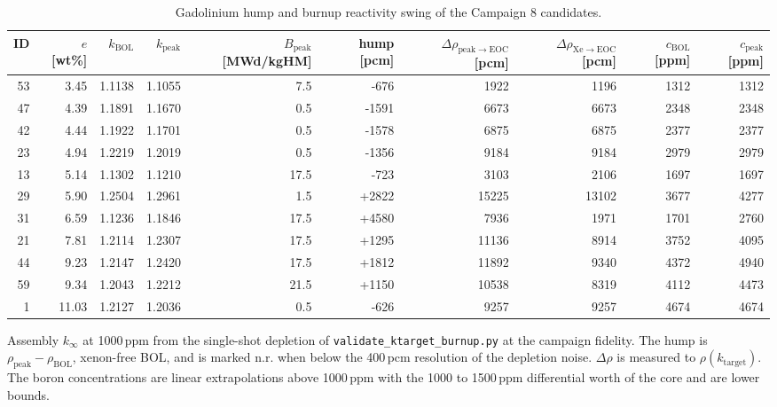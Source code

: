 \begin{table}[htbp]
  \centering
  \caption[Reactivity swing of the Campaign 8 candidates]{Gadolinium hump and burnup reactivity swing of the Campaign 8 candidates.}
  \label{tab:c8-swing}
  \begin{threeparttable}
  \begin{tabular}{@{}r r r r r r r r r r@{}}
    \toprule
    ID & $e$ [wt\%] & $k_\mathrm{BOL}$ & $k_\mathrm{peak}$ & $B_\mathrm{peak}$ [MWd/kgHM] & hump [pcm] & $\Delta\rho_\mathrm{peak\to EOC}$ [pcm] & $\Delta\rho_\mathrm{Xe\to EOC}$ [pcm] & $c_\mathrm{BOL}$ [ppm] & $c_\mathrm{peak}$ [ppm] \\
    \midrule
    53 & 3.45 & 1.1138 & 1.1055 & 7.5 & -676 & 1922 & 1196 & 1312 & 1312 \\
    47 & 4.39 & 1.1891 & 1.1670 & 0.5 & -1591 & 6673 & 6673 & 2348 & 2348 \\
    42 & 4.44 & 1.1922 & 1.1701 & 0.5 & -1578 & 6875 & 6875 & 2377 & 2377 \\
    23 & 4.94 & 1.2219 & 1.2019 & 0.5 & -1356 & 9184 & 9184 & 2979 & 2979 \\
    13 & 5.14 & 1.1302 & 1.1210 & 17.5 & -723 & 3103 & 2106 & 1697 & 1697 \\
    29 & 5.90 & 1.2504 & 1.2961 & 1.5 & +2822 & 15225 & 13102 & 3677 & 4277 \\
    31 & 6.59 & 1.1236 & 1.1846 & 17.5 & +4580 & 7936 & 1971 & 1701 & 2760 \\
    21 & 7.81 & 1.2114 & 1.2307 & 17.5 & +1295 & 11136 & 8914 & 3752 & 4095 \\
    44 & 9.23 & 1.2147 & 1.2420 & 17.5 & +1812 & 11892 & 9340 & 4372 & 4940 \\
    59 & 9.34 & 1.2043 & 1.2212 & 21.5 & +1150 & 10538 & 8319 & 4112 & 4473 \\
    1 & 11.03 & 1.2127 & 1.2036 & 0.5 & -626 & 9257 & 9257 & 4674 & 4674 \\
    \bottomrule
  \end{tabular}
  \begin{tablenotes}\footnotesize
    \item Assembly $k_\infty$ at 1000\,ppm from the single-shot depletion of \texttt{validate\_ktarget\_burnup.py} at the campaign fidelity. The hump is $\rho_\mathrm{peak} - \rho_\mathrm{BOL}$, xenon-free BOL, and is marked n.r. when below the 400\,pcm resolution of the depletion noise. $\Delta\rho$ is measured to $\rho(k_\mathrm{target})$. The boron concentrations are linear extrapolations above 1000\,ppm with the 1000 to 1500\,ppm differential worth of the core and are lower bounds.
  \end{tablenotes}
  \end{threeparttable}
\end{table}
